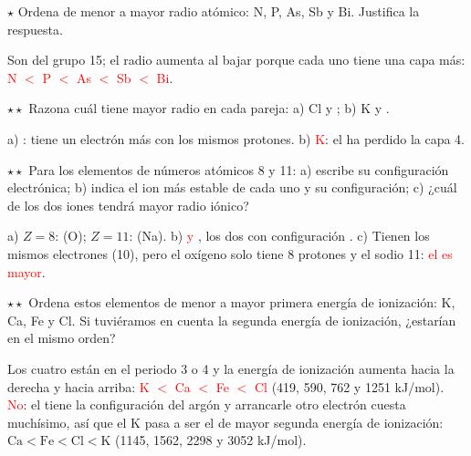 \begin{exercise}
    \(\star\) Ordena de menor a mayor radio atómico: N, P, As, Sb y Bi. Justifica la respuesta.
    \begin{solu}
        Son del grupo 15; el radio aumenta al bajar porque cada uno tiene una capa más:
        \textcolor{red}{N \(<\) P \(<\) As \(<\) Sb \(<\) Bi}.
    \end{solu}
\end{exercise}

\begin{exercise}
    \(\star\star\) Razona cuál tiene mayor radio en cada pareja: a) Cl y ; b) K y .
    \begin{solu}
        a) \textcolor{red}{}: tiene un electrón más con los mismos protones. b) \textcolor{red}{K}: el  ha perdido
        la capa 4.
    \end{solu}
\end{exercise}

\begin{exercise}
    \(\star\star\) Para los elementos de números atómicos 8 y 11: a) escribe su configuración electrónica; b) indica el ion más
    estable de cada uno y su configuración; c) ¿cuál de los dos iones tendrá mayor radio iónico?
    \begin{solu}
        a) \(Z = 8\):  (O); \(Z = 11\):  (Na). b) \textcolor{red}{ y
        }, los dos con configuración . c) Tienen los mismos electrones (10), pero el oxígeno solo
        tiene 8 protones y el sodio 11: \textcolor{red}{el  es mayor}.
    \end{solu}
\end{exercise}

\begin{exercise}
    \(\star\star\) Ordena estos elementos de menor a mayor primera energía de ionización: K, Ca, Fe y Cl. Si tuviéramos en cuenta la
    segunda energía de ionización, ¿estarían en el mismo orden?
    \begin{solu}
        Los cuatro están en el periodo 3 o 4 y la energía de ionización aumenta hacia la derecha y hacia arriba:
        \textcolor{red}{K \(<\) Ca \(<\) Fe \(<\) Cl} (419, 590, 762 y 1251 kJ/mol).
        \textcolor{red}{No}: el  tiene la configuración del argón y arrancarle otro electrón cuesta muchísimo, así que el K
        pasa a ser el de mayor segunda energía de ionización: \(\mathrm{Ca} < \mathrm{Fe} < \mathrm{Cl} < \mathrm{K}\)
        (1145, 1562, 2298 y 3052 kJ/mol).
    \end{solu}
\end{exercise}

